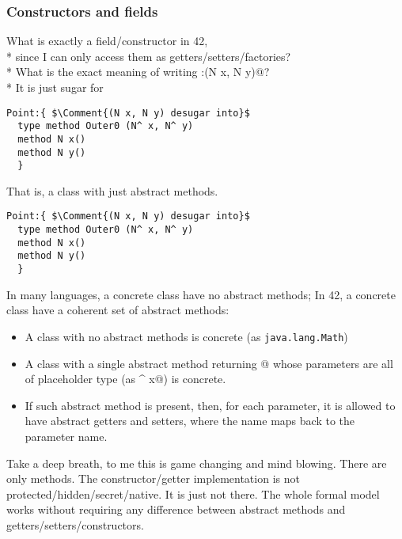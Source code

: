 \begin{frame}[fragile]
\frametitle{Constructors and fields}

%      

\PresentationOnly\pause What is exactly a field/constructor in 42,
${}_{}$\\*
\PresentationOnly\pause since I can only
access them as getters/setters/factories?
${}_{}$\\*
\PresentationOnly\pause What is the exact meaning of writing
\Q@Point:{(N x, N y)}@?
${}_{}$\\*
\PresentationOnly\pause
It is just sugar for 
\begin{NiceCode}{59ex}{1}
\begin{lstlisting}
Point:{ $\Comment{(N x, N y) desugar into}$
  type method Outer0 (N^ x, N^ y)
  method N x()
  method N y()
  }
\end{lstlisting}
\end{NiceCode}

That is, a class with just abstract methods.
\end{frame}


\begin{frame}[fragile]
\begin{NiceCode}{59ex}{1}
\begin{lstlisting}
Point:{ $\Comment{(N x, N y) desugar into}$
  type method Outer0 (N^ x, N^ y)
  method N x()
  method N y()
  }
\end{lstlisting}
\end{NiceCode}
\PresentationOnly\pause In many languages, a concrete class have no abstract methods;
In 42, a concrete class have a \alert{coherent set} of abstract methods:
\begin{itemize}
\PresentationOnly\pause\item A class with no abstract methods is concrete {\small(as {\texttt{java.lang.Math}})}
\PresentationOnly\pause\item A class with a single abstract \Q@type@ method returning @
whose parameters are all of placeholder type (as \Q@N^ x@) is concrete.
\PresentationOnly\pause\item If such abstract \Q@type@ method is present, then, for each parameter,
it is allowed to have abstract getters and setters,
where the name maps back to the parameter name.
\end{itemize}
\PresentationOnly\pause
Take a deep breath, to me this is game changing and mind blowing.
There are only methods. The constructor/getter implementation is not
protected/hidden/secret/native. It is just \alert{not there}.
\PresentationOnly\pause The whole formal model works without requiring any difference between abstract methods
and getters/setters/constructors.

\end{frame}

